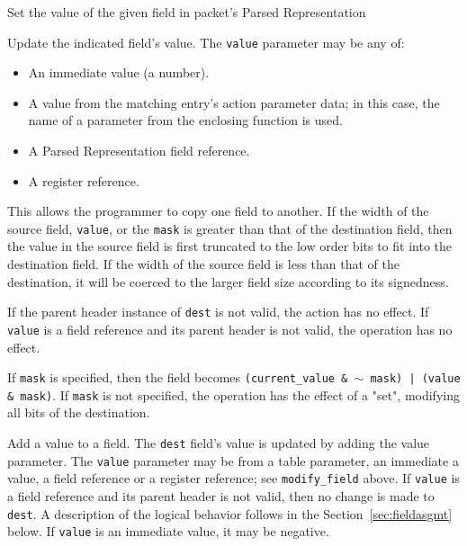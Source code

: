 \documentclass[12pt]{article}
\begin{document}
{ %
Set the value of the given field in packet's Parsed Representation
}
{ %
}
{ %
Update the indicated field's value. The \texttt{value} parameter may be any of:

\begin{itemize}
\item
An immediate value (a number).
\item
A value from the matching entry's action parameter data; in this case, the 
name of a parameter from the enclosing function is used.
\item
A Parsed Representation field reference.
\item
A register reference.
\end{itemize}


This allows the programmer to copy one field to another. If the width of 
the source field, \texttt{value}, or the \texttt{mask} is greater than that of the destination 
field, then the value in the source field is first truncated to the low order 
bits to fit into the destination field. If the width of the source field 
is less than that of the destination, it will be coerced to the larger field 
size according to its signedness.

If the parent header instance of \texttt{dest} is not valid, the action has no effect. 
If \texttt{value} is a field reference and its parent header is not valid, the operation 
has no effect.

If \texttt{mask} is specified, then the field becomes \texttt{(current_value \& $\sim$ mask) | 
(value \& mask)}.  If \texttt{mask} is not specified, the operation has the effect 
of a "set", modifying all bits of the destination.

}


{ %
Add a value to a field.
}
{ %
}
{ %
The \texttt{dest} field's value is updated by adding the value parameter. The \texttt{value} parameter 
may be from a table parameter, an immediate a value, a field reference or 
a register reference; see \texttt{modify_field} above.  If \texttt{value} is a field reference 
and its parent header is not valid, then no change is made to \texttt{dest}. A description 
of the logical behavior follows in the Section~\ref{sec:fieldasgmt} below.
If \texttt{value} is an immediate value, it may 
be negative.
}
\end{document}
